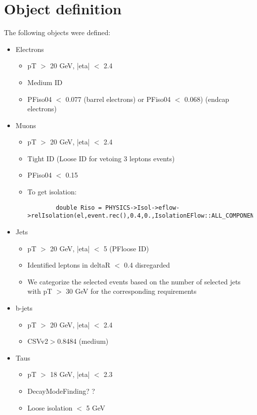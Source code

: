 \documentclass[12pt,A4paper]{article}
\begin{document}
\section{Object definition}
The following objects were defined:
\begin{itemize}
\item Electrons
\begin{itemize}
\item
    pT $>$ 20 GeV, |eta| $<$ 2.4
\item
    Medium ID
\item
    PFiso04 $<$ 0.077 (barrel electrons) or PFiso04 $<$ 0.068) (endcap electrons) 
\end{itemize}
\item
Muons
\begin{itemize}
\item
    pT $>$ 20 GeV, |eta| $<$ 2.4
\item
    Tight ID (Loose ID for vetoing 3 leptons events)
\item
    PFiso04 $<$ 0.15 

\item
To get isolation:\\

\begin{lstlisting}
        double Riso = PHYSICS->Isol->eflow->relIsolation(el,event.rec(),0.4,0.,IsolationEFlow::ALL_COMPONENTS);
\end{lstlisting}

\end{itemize}
\item
Jets

\begin{itemize}
\item
    pT $>$ 20 GeV, |eta| $<$ 5 (PFloose ID)
\item
    Identified leptons in {delta}R $<$ 0.4 disregarded
\item
    We categorize the selected events based on the number of selected jets with pT $>$ 30 GeV for the corresponding requirements 

\end{itemize}
\item
b-jets

\begin{itemize}
\item
    pT $>$ 20 GeV, |eta| $<$ 2.4
\item
    CSVv2$>$0.8484 (medium) 

\end{itemize}
\item
Taus
\begin{itemize}
\item
    pT $>$ 18 GeV, |eta| $<$ 2.3
\item
    DecayModeFinding? ?
\item
    Loose isolation $<$ 5 GeV 
\end{itemize}
\end{itemize}
\end{document}
